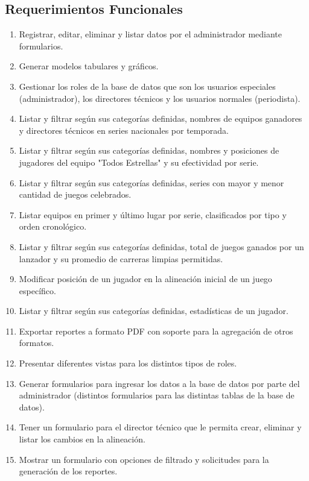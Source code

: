 \documentclass{report}
\begin{document}
        \subsection*{Requerimientos Funcionales}
            \begin{enumerate}
                \item Registrar, editar, eliminar y listar datos por el administrador mediante formularios.
                \item Generar modelos tabulares y gráficos.
                \item Gestionar los roles de la base de datos que son los usuarios especiales (administrador), los 
                directores técnicos y los usuarios normales (periodista).
                \item Listar y filtrar según sus categorías definidas, nombres de equipos ganadores y directores 
                técnicos en series nacionales por temporada.
                \item Listar y filtrar según sus categorías definidas, nombres y posiciones de jugadores del equipo 
                "Todos Estrellas" y su efectividad por serie.
                \item Listar y filtrar según sus categorías definidas, series con mayor y menor cantidad de juegos 
                celebrados.
                \item Listar equipos en primer y último lugar por serie, clasificados por tipo y orden cronológico.
                \item Listar y filtrar según sus categorías definidas, total de juegos ganados por un lanzador y su 
                promedio de carreras limpias permitidas.
                \item Modificar posición de un jugador en la alineación inicial de un juego específico.
                \item Listar y filtrar según sus categorías definidas, estadísticas de un jugador.
                \item Exportar reportes a formato PDF con soporte para la agregación de otros formatos.
                \item Presentar diferentes vistas para los distintos tipos de roles.
                \item Generar formularios para ingresar los datos a la base de datos por parte del administrador 
                (distintos formularios para las distintas tablas de la base de datos).
                \item Tener un formulario para el director técnico que le permita crear, eliminar y listar los 
                cambios en  la alineación.
                \item Mostrar un formulario con opciones de filtrado y solicitudes para la generación de los reportes.
            \end{enumerate}
\end{document}
